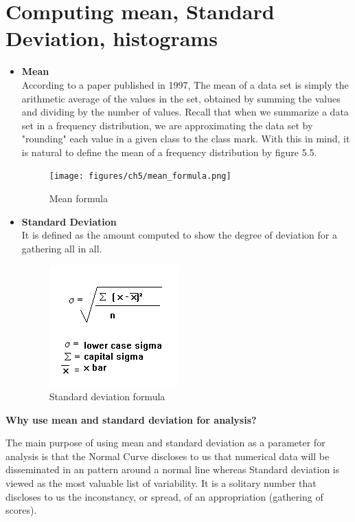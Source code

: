 \newpage

\section{Computing mean, Standard Deviation, histograms}

\begin{itemize}
    \item \textbf{Mean} \\
    According to a paper published in 1997, The mean of a data set is simply the arithmetic average of the values in the set, obtained by summing the values and dividing by the number of values. Recall that when we summarize a data set in a frequency distribution, we are approximating the data set by "rounding" each value in a given class to the class mark. With this in mind, it is natural to define the mean of a frequency distribution by figure 5.5. \cite{Mean_SD}
    
     \begin{figure}[H]
            \centering
            \texttt{[image: figures/ch5/mean\_formula.png]}
            \caption{\label{fig:info_button} Mean formula}
    \end{figure}
    
    \item \textbf{Standard Deviation} \\
   It is defined as the amount computed to show the degree of deviation for a gathering all in all.
    
     \begin{figure}[H]
            \centering
            \includegraphics[width=0.25\linewidth]{figures/ch5/standard_deviation.png}
            \caption{\label{fig:info_button} Standard deviation formula}
    \end{figure}
    
\end{itemize}

\centerline{\textbf{Why use mean and standard deviation for analysis?}}

The main purpose of using mean and standard deviation as a parameter for analysis is that the Normal Curve discloses to us that numerical data will be disseminated in an pattern around a normal line whereas Standard deviation is viewed as the most valuable list of variability. It is a solitary number that discloses to us the inconstancy, or spread, of an appropriation (gathering of scores).

